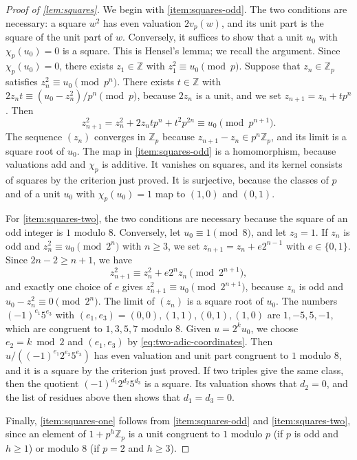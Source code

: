 \documentclass[12pt,oneside,openany]{book}
\theoremstyle{definition}
\theoremstyle{plain}
\numberwithin{equation}{chapter}
\theoremstyle{plain}
\theoremstyle{definition}
\theoremstyle{remark}
\newcommand{\Z}{\mathbb Z}
\begin{document}
\begin{proof}[Proof of \cref{lem:squares}]
We begin with \ref{item:squares-odd}. The two conditions are necessary: a square $w^2$ has even valuation $2v_p(w)$, and its unit part is the square of the unit part of $w$. Conversely, it suffices to show that a unit $u_0$ with $\chi_p(u_0)=0$ is a square. This is Hensel's lemma; we recall the argument. Since $\chi_p(u_0)=0$, there exists $z_1\in\Z$ with $z_1^2\equiv u_0\pmod p$. Suppose that $z_n\in\Z_p$ satisfies $z_n^2\equiv u_0\pmod{p^n}$. There exists $t\in\Z$ with $2z_nt\equiv(u_0-z_n^2)/p^n\pmod p$, because $2z_n$ is a unit, and we set $z_{n+1}=z_n+tp^n$. Then
\begin{equation}
z_{n+1}^2=z_n^2+2z_ntp^n+t^2p^{2n}\equiv u_0\pmod{p^{n+1}}.
\end{equation}
The sequence $(z_n)$ converges in $\Z_p$ because $z_{n+1}-z_n\in p^n\Z_p$, and its limit is a square root of $u_0$. The map in \ref{item:squares-odd} is a homomorphism, because valuations add and $\chi_p$ is additive. It vanishes on squares, and its kernel consists of squares by the criterion just proved. It is surjective, because the classes of $p$ and of a unit $u_0$ with $\chi_p(u_0)=1$ map to $(1,0)$ and $(0,1)$.

For \ref{item:squares-two}, the two conditions are necessary because the square of an odd integer is $1$ modulo $8$. Conversely, let $u_0\equiv1\pmod8$, and let $z_3=1$. If $z_n$ is odd and $z_n^2\equiv u_0\pmod{2^n}$ with $n\ge3$, we set $z_{n+1}=z_n+e2^{n-1}$ with $e\in\{0,1\}$. Since $2n-2\ge n+1$, we have
\begin{equation}
z_{n+1}^2\equiv z_n^2+e2^nz_n\pmod{2^{n+1}},
\end{equation}
and exactly one choice of $e$ gives $z_{n+1}^2\equiv u_0\pmod{2^{n+1}}$, because $z_n$ is odd and $u_0-z_n^2\equiv0\pmod{2^n}$. The limit of $(z_n)$ is a square root of $u_0$. The numbers $(-1)^{e_1}5^{e_3}$ with $(e_1,e_3)=(0,0),(1,1),(0,1),(1,0)$ are $1,-5,5,-1$, which are congruent to $1,3,5,7$ modulo $8$. Given $u=2^ku_0$, we choose $e_2=k\bmod2$ and $(e_1,e_3)$ by \eqref{eq:two-adic-coordinates}. Then $u/((-1)^{e_1}2^{e_2}5^{e_3})$ has even valuation and unit part congruent to $1$ modulo $8$, and it is a square by the criterion just proved. If two triples give the same class, then the quotient $(-1)^{d_1}2^{d_2}5^{d_3}$ is a square. Its valuation shows that $d_2=0$, and the list of residues above then shows that $d_1=d_3=0$.

Finally, \ref{item:squares-one} follows from \ref{item:squares-odd} and \ref{item:squares-two}, since an element of $1+p^h\Z_p$ is a unit congruent to $1$ modulo $p$ (if $p$ is odd and $h\ge1$) or modulo $8$ (if $p=2$ and $h\ge3$).
\end{proof}
\end{document}
